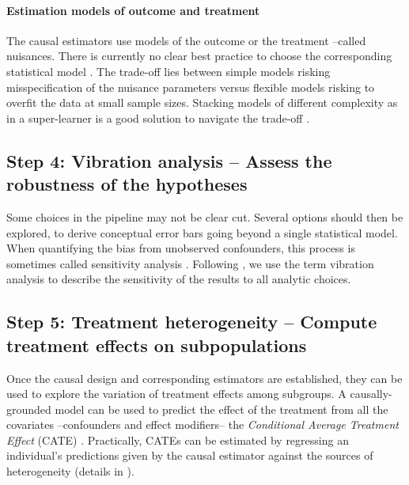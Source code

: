 \documentclass[10pt,letterpaper]{article}
\begin{document}
\paragraph{Estimation models of outcome and treatment}

The causal estimators use models of the outcome or the treatment --called
nuisances. There is currently no clear best practice to choose the corresponding
statistical model \cite{wendling2018comparing, dorie2019automated}. The
trade-off lies between simple models risking misspecification of the nuisance
parameters versus flexible models risking to overfit the data at small sample
sizes. Stacking models of different complexity as in a super-learner is a good
solution to navigate the trade-off \cite{van2007super,doutreligne2023select}.

\subsection*{Step 4: Vibration analysis -- Assess the robustness of the hypotheses}\label{sec:vibration_analysis}

Some choices in the pipeline may not be clear cut. Several options should then
be explored, to derive conceptual error bars going beyond a single statistical
model. When quantifying the bias from unobserved confounders, this process is
sometimes called sensitivity analysis \cite{schneeweiss2006sensitivity,thabane2013tutorial,fda_statistical_2021}.
Following \cite{patel2015assessment}, we use the term vibration analysis to
describe the sensitivity of the results to all analytic choices.

\subsection*{Step 5: Treatment heterogeneity -- Compute treatment effects on subpopulations}\label{sec:treatment_heterogeneity}

Once the causal design and corresponding estimators are established, they can be
used to explore the variation of treatment effects among subgroups. A
causally-grounded model can be used to predict the effect of the treatment from
all the covariates --confounders and effect modifiers-- the \emph{Conditional Average
    Treatment Effect} (CATE) \cite{robertson2021assessing}. Practically, CATEs can be estimated by regressing
an individual's predictions given by the causal estimator against the sources of
heterogeneity (details in ).
\end{document}
